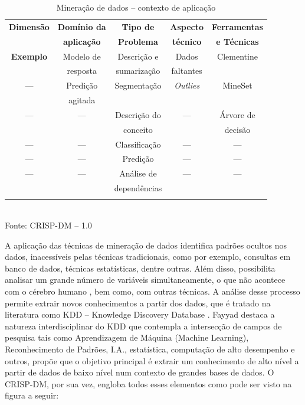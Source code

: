 \begin{table}[!ht]

\caption{Mineração de dados -- contexto de aplicação \cite{Crisp2000}}
\vspace{1mm}
\centering
\begin{tabular}{c|c|c|c|c}
\textbf{Dimensão} & \textbf{Domínio da} & \textbf{Tipo de } & \textbf{Aspecto } & \textbf{Ferramentas } \\
		  & \textbf{aplicação}  & \textbf{Problema} & \textbf{técnico}  & \textbf{e Técnicas}   \\ \hline
\textbf{Exemplo}  & Modelo de           & Descrição e       & Dados             & Clementine  \\
                  & resposta            & sumarização       & faltantes         &             \\ \hline
      --- 	      & Predição            & Segmentação       & \textit{Outlies}  & MineSet     \\
         	      & agitada             &                   &                   &             \\ \hline
      ---         & ---                 & Descrição do      & ---               & Árvore de   \\
                  &                     & conceito          &                   & decisão     \\ \hline
      ---         & ---                 & Classificação     & ---               & ---         \\ \hline
      ---         & ---                 & Predição          & ---               & ---         \\ \hline
      ---         & ---                 & Análise de        & ---               & ---         \\
                  &                     & dependências      &                   & \\            
\\
\end{tabular}
\\
\tiny Fonte: CRISP-DM -- 1.0
\end{table}


A aplicação das técnicas de mineração de dados identifica padrões ocultos nos dados, inacessíveis pelas técnicas tradicionais,
como por exemplo, consultas em banco de dados, técnicas estatísticas, dentre outras. Além disso, possibilita analisar um grande número de 
variáveis simultaneamente, o que não acontece com o cérebro humano \cite{possas1998data}, bem como, com outras técnicas. 
A análise desse processo permite extrair novos conhecimentos a partir dos dados, que é tratado na literatura como 
KDD -- Knowledge Discovery Database \cite{FayyadUeoutros}. Fayyad destaca a natureza interdisciplinar do KDD que contempla a intersecção 
de campos de pesquisa tais como Aprendizagem de Máquina (Machine Learning), Reconhecimento de Padrões, I.A., estatística, computação de alto 
desempenho e outros, propõe que o objetivo principal é extrair um conhecimento de alto nível a partir de dados de baixo nível num contexto de 
grandes bases de dados.
O CRISP-DM, por sua vez, engloba todos esses elementos como pode ser visto na figura a seguir:

